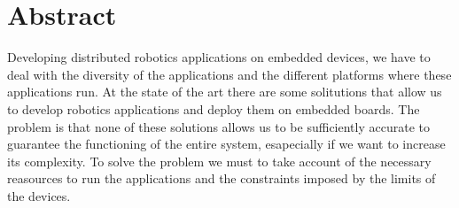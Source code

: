 \chapter{Abstract}
Developing distributed robotics applications on embedded devices, we have to deal with the diversity of the applications and the different platforms where these applications run.
At the state of the art there are some solitutions that allow us to develop robotics applications and deploy them on embedded boards. 
The problem is that none of these solutions allows us to be sufficiently accurate to guarantee the functioning of the entire system, esapecially if we want to increase its complexity.
To solve the problem we must to take account of the necessary reasources to run the applications and the constraints imposed by the limits of the devices.


\clearpage
\thispagestyle{empty}